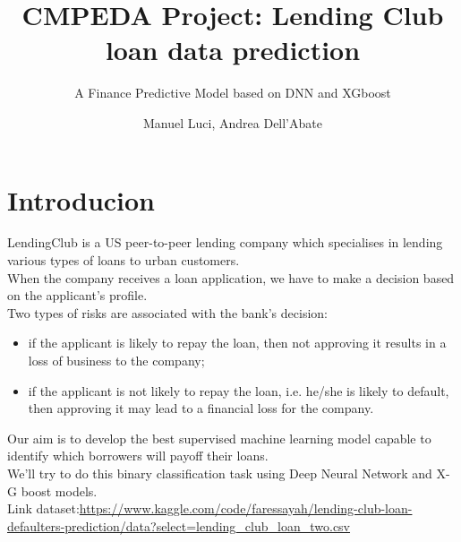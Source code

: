 \documentclass[french]{scrartcl}
\author{Manuel Luci, Andrea Dell'Abate}
\title{CMPEDA Project: Lending Club loan data prediction}
\date{}
\subtitle{A Finance Predictive Model based on DNN and XGboost}
\begin{document}
\maketitle
\section{Introducion}
LendingClub is a US peer-to-peer lending company which specialises in lending various types of loans to urban customers.\\
When the company receives a loan application, we have to make a decision based on the applicant’s profile. \\
Two types of risks are associated with the bank's decision:
\begin{itemize}
	\item if the applicant is likely to repay the loan, then not approving it results in a loss of business to the company;
	
	\item if the applicant is not likely to repay the loan, i.e. he/she is likely to
	default, then approving it may lead to a financial loss for the company.
\end{itemize}
Our aim is to develop the best supervised machine learning model capable to identify which borrowers will payoff their loans.\\
We’ll try to do this binary classification task using Deep Neural Network and X-G
boost models.\\
Link dataset:\url{https://www.kaggle.com/code/faressayah/lending-club-loan-defaulters-prediction/data?select=lending_club_loan_two.csv}
\end{document}
